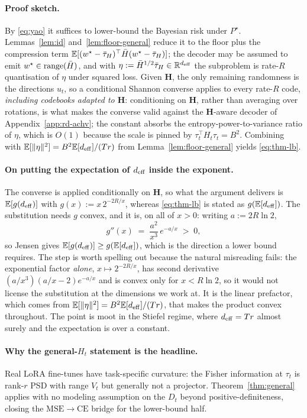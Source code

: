 \paragraph{Proof sketch.} By \eqref{eq:yao} it suffices to lower-bound
the Bayesian risk under $P^\star$. Lemmas~\ref{lem:id}
and~\ref{lem:floor-general} reduce it to the floor plus the
compression term $\mathbb{E}[(w^\star-\bar{\tau}_H)^\top\bar H(w^\star-\bar{\tau}_H)]$; the
decoder may be assumed to emit $w^\star \in \operatorname{range}(\bar H)$, and with
$\eta := \bar H^{1/2}\bar{\tau}_H \in \mathbb{R}^{d_{\mathrm{eff}}}$ the subproblem is rate-$R$
quantisation of $\eta$ under squared loss. Given $\boldsymbol H$, the
only remaining randomness is the directions $u_t$, so a conditional
Shannon converse applies to every rate-$R$ code, \emph{including
codebooks adapted to $\boldsymbol H$}: conditioning on
$\boldsymbol H$, rather than averaging over rotations, is what makes
the converse valid against the $\boldsymbol H$-aware decoder of
Appendix~\ref{app:rd-achv}; the constant absorbs the entropy-power-to-variance
ratio of $\eta$, which is $O(1)$ because the scale is pinned by
$\tau_t^\top H_t \tau_t = B^2$. Combining with
$\mathbb{E}[\|\eta\|^2] = B^2\mathbb{E}[d_{\mathrm{eff}}]/(Tr)$ from
Lemma~\ref{lem:floor-general} yields \eqref{eq:thm-lb}.

\paragraph{On putting the expectation of $d_{\mathrm{eff}}$ inside the exponent.} The converse is
applied conditionally on $\boldsymbol H$, so what the argument delivers is
$\mathbb{E}[g(d_{\mathrm{eff}})]$ with $g(x) := x\,2^{-2R/x}$, whereas \eqref{eq:thm-lb} is
stated as $g(\mathbb{E}[d_{\mathrm{eff}}])$. The substitution needs $g$ convex, and it is, on
all of $x > 0$: writing $a := 2R\ln 2$,
\[
  g''(x) \;=\; \frac{a^{2}}{x^{3}}\,e^{-a/x} \;>\; 0 ,
\]
so Jensen gives $\mathbb{E}[g(d_{\mathrm{eff}})] \geq g(\mathbb{E}[d_{\mathrm{eff}}])$, which is the direction a
lower bound requires. The step is worth spelling out because the natural
misreading fails: the exponential factor \emph{alone}, $x \mapsto
2^{-2R/x}$, has second derivative $(a/x^{3})(a/x - 2)e^{-a/x}$ and is
convex only for $x < R\ln 2$, so it would not license the substitution at
the dimensions we work at. It is the linear prefactor, which comes from
$\mathbb{E}[\|\eta\|^2] = B^2\mathbb{E}[d_{\mathrm{eff}}]/(Tr)$, that makes the product convex
throughout. The point is moot in the Stiefel regime, where $d_{\mathrm{eff}} = Tr$
almost surely and the expectation is over a constant.

\paragraph{Why the general-$H_t$ statement is the headline.} Real LoRA
fine-tunes have task-specific curvature: the Fisher information at
$\tau_t$ is rank-$r$ PSD with range $V_t$ but generally not a
projector. Theorem~\ref{thm:general} applies with no modeling
assumption on the $D_t$ beyond positive-definiteness, closing the
$\mathrm{MSE}\to\mathrm{CE}$ bridge for the lower-bound half.

